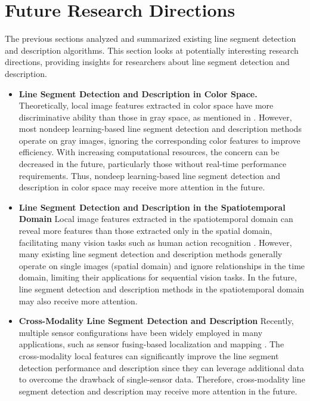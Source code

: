 \documentclass[journal,compsoc]{IEEEtran}
\begin{document}
\section{Future Research Directions}
\label{research_directions}
The previous sections analyzed and summarized existing line segment detection and description algorithms. This section looks at potentially interesting research directions, providing insights for researchers about line segment detection and description.

\begin{itemize}
	\item \textbf{Line Segment Detection and Description in Color Space.}
	Theoretically, local image features extracted in color space have more discriminative ability than those in gray space, as mentioned in \cite{1542040,977559}. However, most nondeep learning-based line segment detection and description methods operate on gray images, ignoring the corresponding color features to improve efficiency. With increasing computational resources, the concern can be decreased in the future, particularly those without real-time performance requirements. Thus, nondeep learning-based line segment detection and description in color space may receive more attention in the future.
	
	\item \textbf{Line Segment Detection and Description in the Spatiotemporal Domain}
	Local image features extracted in the spatiotemporal domain can reveal more features than those extracted only in the spatial domain, facilitating many vision tasks such as human action recognition \cite{6725627}. However, many existing line segment detection and description methods generally operate on single images (spatial domain) and ignore relationships in the time domain, limiting their applications for sequential vision tasks. In the future, line segment detection and description methods in the spatiotemporal domain may also receive more attention.
		
	\item \textbf{Cross-Modality Line Segment Detection and Description}
	Recently, multiple sensor configurations have been widely employed in many applications, such as sensor fusing-based localization and mapping \cite{9502143,9826793}. The cross-modality local features \cite{9678058} can significantly improve the line segment detection performance and description since they can leverage additional data to overcome the drawback of single-sensor data. Therefore, cross-modality line segment detection and description may receive more attention in the future.
		

\end{itemize}
\end{document}
